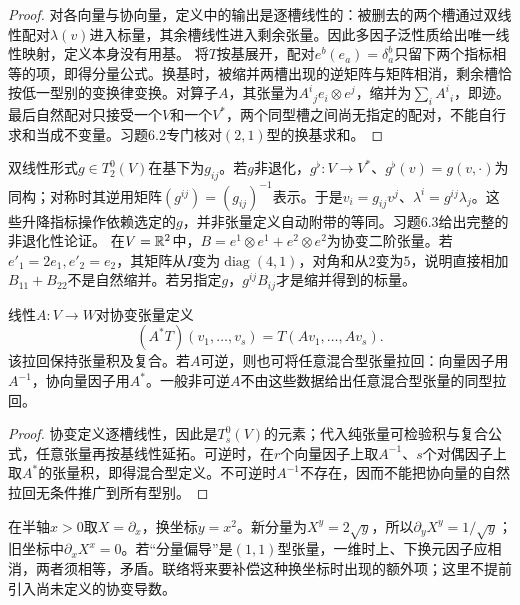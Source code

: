 \begin{proof}
对各向量与协向量，定义中的输出是逐槽线性的：被删去的两个槽通过双线性配对$\lambda(v)$进入标量，其余槽线性进入剩余张量。因此多因子泛性质给出唯一线性映射，定义本身没有用基。
将$T$按基展开，配对$e^b(e_a)=\delta^b_a$只留下两个指标相等的项，即得分量公式。换基时，被缩并两槽出现的逆矩阵与矩阵相消，剩余槽恰按低一型别的变换律变换。对算子$A$，其张量为$A^i{}_j e_i\otimes e^j$，缩并为$\sum_i A^i{}_i$，即迹。最后自然配对只接受一个$V$和一个$V^*$，两个同型槽之间尚无指定的配对，不能自行求和当成不变量。习题6.2专门核对$(2,1)$型的换基求和。
\end{proof}
\begin{example}
双线性形式$g\in T^0_2(V)$在基下为$g_{ij}$。若$g$非退化，$g^\flat:V\to V^*$、$g^\flat(v)=g(v,\cdot)$为同构；对称时其逆用矩阵$(g^{ij})=(g_{ij})^{-1}$表示。于是$v_i=g_{ij}v^j$、$\lambda^i=g^{ij}\lambda_j$。这些升降指标操作依赖选定的$g$，并非张量定义自动附带的等同。习题6.3给出完整的非退化性论证。
在$V=\mathbb{R}^2$中，$B=e^1\otimes e^1+e^2\otimes e^2$为协变二阶张量。若$e'_1=2e_1,e'_2=e_2$，其矩阵从$I$变为$\operatorname{diag}(4,1)$，对角和从$2$变为$5$，说明直接相加$B_{11}+B_{22}$不是自然缩并。若另指定$g$，$g^{ij}B_{ij}$才是缩并得到的标量。
\end{example}
\begin{proposition}[协变拉回与型别边界]\label{prop:covariant-pullback}
线性$A:V\to W$对协变张量定义
\[
 (A^*T)(v_1,\ldots,v_s)=T(Av_1,\ldots,Av_s).
\]
该拉回保持张量积及复合。若$A$可逆，则也可将任意混合型张量拉回：向量因子用$A^{-1}$，协向量因子用$A^*$。一般非可逆$A$不由这些数据给出任意混合型张量的同型拉回。
\end{proposition}
\begin{proof}
协变定义逐槽线性，因此是$T^0_s(V)$的元素；代入纯张量可检验积与复合公式，任意张量再按基线性延拓。可逆时，在$r$个向量因子上取$A^{-1}$、$s$个对偶因子上取$A^*$的张量积，即得混合型定义。不可逆时$A^{-1}$不存在，因而不能把协向量的自然拉回无条件推广到所有型别。
\end{proof}
\begin{example}[普通偏导不自动成为张量]
在半轴$x>0$取$X=\partial_x$，换坐标$y=x^2$。新分量为$X^y=2\sqrt y$，所以$\partial_yX^y=1/\sqrt y$；旧坐标中$\partial_xX^x=0$。若“分量偏导”是$(1,1)$型张量，一维时上、下换元因子应相消，两者须相等，矛盾。联络将来要补偿这种换坐标时出现的额外项；这里不提前引入尚未定义的协变导数。
\end{example}
